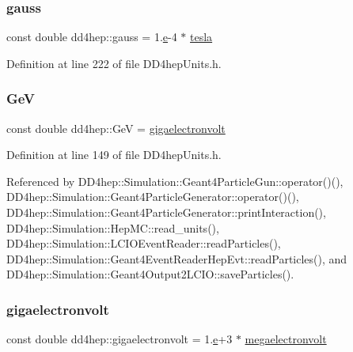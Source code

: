 \subsubsection{\texorpdfstring{gauss}{gauss}}
{\footnotesize\ttfamily const double dd4hep\+::gauss = 1.\hyperlink{_volumes_8cpp_a8a9a1f93e9b09afccaec215310e64142}{e}-\/4 $\ast$ \hyperlink{namespacedd4hep_aaddab60c1ddca9986195f0d5cfe03259}{tesla}\hspace{0.3cm}{\ttfamily [static]}}



Definition at line 222 of file D\+D4hep\+Units.\+h.

\hypertarget{namespacedd4hep_a3b49780cbe455fda1f6b8a58ff555ae5}{}\label{namespacedd4hep_a3b49780cbe455fda1f6b8a58ff555ae5} 
\subsubsection{\texorpdfstring{GeV}{GeV}}
{\footnotesize\ttfamily const double dd4hep\+::\+GeV = \hyperlink{namespacedd4hep_ac36e148fcf16a0ffd9061c13ba225659}{gigaelectronvolt}\hspace{0.3cm}{\ttfamily [static]}}



Definition at line 149 of file D\+D4hep\+Units.\+h.



Referenced by D\+D4hep\+::\+Simulation\+::\+Geant4\+Particle\+Gun\+::operator()(), D\+D4hep\+::\+Simulation\+::\+Geant4\+Particle\+Generator\+::operator()(), D\+D4hep\+::\+Simulation\+::\+Geant4\+Particle\+Generator\+::print\+Interaction(), D\+D4hep\+::\+Simulation\+::\+Hep\+M\+C\+::read\+\_\+units(), D\+D4hep\+::\+Simulation\+::\+L\+C\+I\+O\+Event\+Reader\+::read\+Particles(), D\+D4hep\+::\+Simulation\+::\+Geant4\+Event\+Reader\+Hep\+Evt\+::read\+Particles(), and D\+D4hep\+::\+Simulation\+::\+Geant4\+Output2\+L\+C\+I\+O\+::save\+Particles().

\hypertarget{namespacedd4hep_ac36e148fcf16a0ffd9061c13ba225659}{}\label{namespacedd4hep_ac36e148fcf16a0ffd9061c13ba225659} 
\subsubsection{\texorpdfstring{gigaelectronvolt}{gigaelectronvolt}}
{\footnotesize\ttfamily const double dd4hep\+::gigaelectronvolt = 1.\hyperlink{_volumes_8cpp_a8a9a1f93e9b09afccaec215310e64142}{e}+3 $\ast$ \hyperlink{namespacedd4hep_a4e39beba039f7a6bda24a7031c121b2a}{megaelectronvolt}\hspace{0.3cm}{\ttfamily [static]}}



